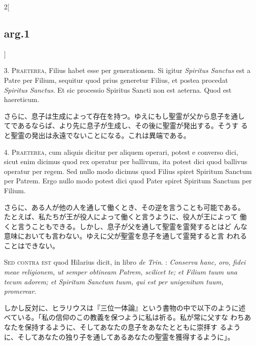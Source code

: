 \documentclass[paper=a4paper,fontsize=10pt,jafontsize=9pt,titlepage]{jlreq}
\begin{document}
\begin{paracol}{2}[\subsection{arg.1}]

3. {\scshape Praeterea}, Filius habet esse per generationem. Si igitur {\itshape
Spiritus Sanctus} est a Patre per Filium, sequitur quod prius
generetur Filius, et postea procedat {\itshape  Spiritus Sanctus}. Et
sic processio  Spiritus Sancti non est aeterna. Quod est haereticum.

\switchcolumn

さらに、息子は生成によって存在を持つ。ゆえにもし聖霊が父から息子を通し
 てであるならば、より先に息子が生成し、その後に聖霊が発出する。そうす
 ると聖霊の発出は永遠でないことになる。これは異端である。


4. {\scshape Praeterea}, cum aliquis dicitur per aliquem operari, potest e converso
dici, sicut enim dicimus quod rex operatur per ballivum, ita potest
dici quod ballivus operatur per regem. Sed nullo modo dicimus quod
Filius spiret  Spiritum Sanctum per Patrem. Ergo nullo modo potest
dici quod Pater spiret  Spiritum Sanctum per Filium.

\switchcolumn

さらに、ある人が他の人を通して働くとき、その逆を言うことも可能である。
 たとえば、私たちが王が役人によって働くと言うように、役人が王によって
 働くと言うこともできる。しかし、息子が父を通して聖霊を霊発するとはど
 んな意味においても言わない。ゆえに父が聖霊を息子を通して霊発すると言
 われることはできない。

\switchcolumn*[\subsection{s.c.}]

{\scshape Sed contra est} quod Hilarius dicit, in libro {\itshape de
 Trin}. : {\itshape Conserva hanc,
oro, fidei meae religionem, ut semper obtineam Patrem, scilicet te; et
Filium tuum una tecum adorem; et  Spiritum Sanctum tuum, qui est per
unigenitum tuum, promerear}.

\switchcolumn

しかし反対に、ヒラリウスは『三位一体論』という書物の中で以下のように述
 べている。「私の信仰のこの教義を保つように私は祈る。私が常に父すな
 わちあなたを保持するように、そしてあなたの息子をあなたとともに崇拝す
 るように、そしてあなたの独り子を通してあるあなたの聖霊を獲得するように」。


\end{paracol}
\end{document}

